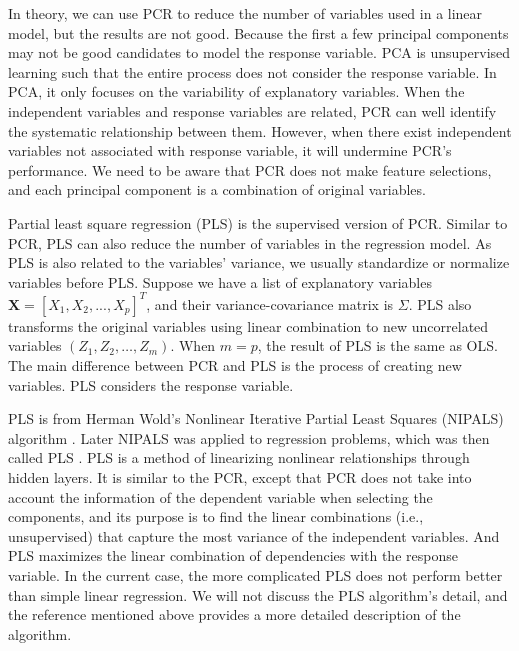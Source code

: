 \documentclass[12pt,]{krantz}
\begin{document}
In theory, we can use PCR to reduce the number of variables used in a linear model, but the results are not good. Because the first a few principal components may not be good candidates to model the response variable. PCA is unsupervised learning such that the entire process does not consider the response variable. In PCA, it only focuses on the variability of explanatory variables. When the independent variables and response variables are related, PCR can well identify the systematic relationship between them. However, when there exist independent variables not associated with response variable, it will undermine PCR's performance. We need to be aware that PCR does not make feature selections, and each principal component is a combination of original variables.

Partial least square regression (PLS)  is the supervised version of PCR. Similar to PCR, PLS can also reduce the number of variables in the regression model.   As PLS is also related to the variables' variance, we usually standardize or normalize variables before PLS. Suppose we have a list of explanatory variables \(\mathbf{X}=[X_{1},X_{2},...,X_{p}]^{T}\), and their variance-covariance matrix is \(\Sigma\). PLS also transforms the original variables using linear combination to new uncorrelated variables \((Z_{1} , Z_{2} , \ldots , Z_{m})\). When \(m=p\), the result of PLS is the same as OLS. The main difference between PCR and PLS is the process of creating new variables. PLS considers the response variable.

PLS is from Herman Wold's Nonlinear Iterative Partial Least Squares (NIPALS) algorithm \citep{wold1973, wold1982} . Later NIPALS was applied to regression problems, which was then called PLS . PLS is a method of linearizing nonlinear relationships through hidden layers. It is similar to the PCR, except that PCR does not take into account the information of the dependent variable when selecting the components, and its purpose is to find the linear combinations (i.e., unsupervised) that capture the most variance of the independent variables. And PLS maximizes the linear combination of dependencies with the response variable. In the current case, the more complicated PLS does not perform better than simple linear regression. We will not discuss the PLS algorithm's detail, and the reference mentioned above provides a more detailed description of the algorithm.
\end{document}

